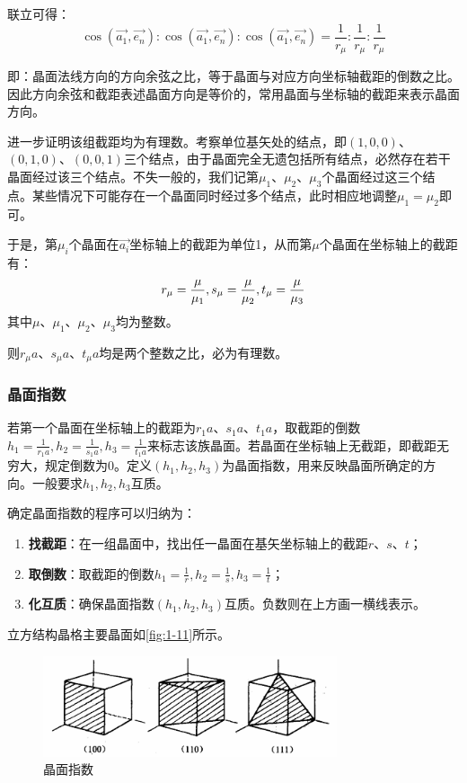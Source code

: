     联立可得：
    \[
        \cos (\vec{a_1}, \vec{e_n}) : \cos (\vec{a_1}, \vec{e_n}) : \cos (\vec{a_1}, \vec{e_n}) = \frac{1}{r_\mu} : \frac{1}{r_\mu} : \frac{1}{r_\mu}
    \]

    即：晶面法线方向的方向余弦之比，等于晶面与对应方向坐标轴截距的倒数之比。因此方向余弦和截距表述晶面方向是等价的，常用晶面与坐标轴的截距来表示晶面方向。

    进一步证明该组截距均为有理数。考察单位基矢处的结点，即$(1,0,0)$、$(0,1,0)$、$(0,0,1)$三个结点，由于晶面完全无遗包括所有结点，必然存在若干晶面经过该三个结点。不失一般的，我们记第$\mu_1$、$\mu_2$、$\mu_3$个晶面经过这三个结点。某些情况下可能存在一个晶面同时经过多个结点，此时相应地调整$\mu_1=\mu_2$即可。

    于是，第$\mu_i$个晶面在$\vec{a_i}$坐标轴上的截距为单位1，从而第$\mu$个晶面在坐标轴上的截距有：
    \[
        r_\mu = \frac{\mu}{\mu_1}, \\
        s_\mu = \frac{\mu}{\mu_2}, \\
        t_\mu = \frac{\mu}{\mu_3}
    \]
    其中$\mu$、$\mu_1$、$\mu_2$、$\mu_3$均为整数。
    
    则$r_\mu a$、$s_\mu a$、$t_\mu a$均是两个整数之比，必为有理数。

\subsubsection{晶面指数}
    若第一个晶面在坐标轴上的截距为$r_1 a$、$s_1 a$、$t_1 a$，取截距的倒数$h_1 = \frac{1}{r_1 a}, h_2 = \frac{1}{s_1 a}, h_3 = \frac{1}{t_1 a}$来标志该族晶面。若晶面在坐标轴上无截距，即截距无穷大，规定倒数为0。定义$(h_1, h_2, h_3)$为晶面指数，用来反映晶面所确定的方向。一般要求$h_1, h_2, h_3$互质。

    确定晶面指数的程序可以归纳为：
    \begin{enumerate}[itemsep=0pt,parsep=0pt]
        \item \textbf{找截距}：在一组晶面中，找出任一晶面在基矢坐标轴上的截距$r$、$s$、$t$；
        \item \textbf{取倒数}：取截距的倒数$h_1 = \frac{1}{r}, h_2 = \frac{1}{s}, h_3 = \frac{1}{t}$；
        \item \textbf{化互质}：确保晶面指数$(h_1, h_2, h_3)$互质。负数则在上方画一横线表示。
    \end{enumerate}

    立方结构晶格主要晶面如\autoref{fig:1-11}所示。

    \begin{figure}[!htbp]
        \centering    
        \includegraphics[height=8em, keepaspectratio=true]{pic/1-35}
        \caption{晶面指数}
        \label{fig:1-11}
    \end{figure}

